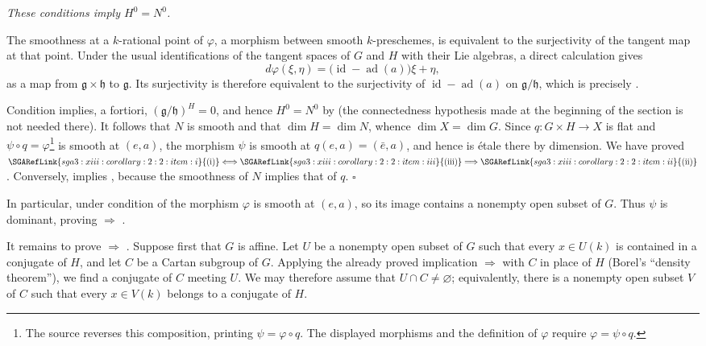 \textit{These conditions imply \(H^0=N^0\).}

The smoothness at a \(k\)-rational point of \(\varphi\), a morphism
between smooth \(k\)-preschemes, is equivalent to the surjectivity of
the tangent map at that point. Under the usual identifications of
the tangent spaces of \(G\) and \(H\) with their Lie algebras, a
direct calculation gives
\[
  d\varphi(\xi,\eta)
  =\bigl(\operatorname{id}-\operatorname{ad}(a)\bigr)\xi+\eta,
\]
as a map from \(\mathfrak g\times\mathfrak h\) to \(\mathfrak g\).
Its surjectivity is therefore equivalent to the surjectivity of
\(\operatorname{id}-\operatorname{ad}(a)\) on
\(\mathfrak g/\mathfrak h\), which is precisely .

Condition  implies, a fortiori,
\((\mathfrak g/\mathfrak h)^H=0\), and hence \(H^0=N^0\) by 
(the connectedness hypothesis made at the beginning of the section
is not needed there). It follows that \(N\) is smooth and that
\(\dim H=\dim N\), whence \(\dim X=\dim G\). Since
\(q:G\times H\to X\) is flat and
\(\psi\circ q=\varphi\)\footnote{The source reverses this composition,
printing \(\psi=\varphi\circ q\). The displayed morphisms and the
definition of \(\varphi\) require \(\varphi=\psi\circ q\).} is smooth
at \((e,a)\), the morphism \(\psi\)
is smooth at \(q(e,a)=(\bar e,a)\), and hence is étale there by
dimension. We have proved
\(\SGARefLink{sga3:xiii:corollary:2:2:item:i}{\mathrm{(i)}}\Longleftrightarrow\SGARefLink{sga3:xiii:corollary:2:2:item:iii}{\mathrm{(iii)}}
\Longrightarrow\SGARefLink{sga3:xiii:corollary:2:2:item:ii}{\mathrm{(ii)}}\). Conversely,  implies ,
because the smoothness of \(N\) implies that of \(q\).
\hfill\(\square\)

In particular, under condition  of  the morphism
\(\varphi\) is smooth at \((e,a)\), so its image contains a nonempty
open subset of \(G\). Thus \(\psi\) is dominant, proving
 \(\Rightarrow\) .

It remains to prove  \(\Rightarrow\) . Suppose first that
\(G\) is affine. Let \(U\) be a nonempty open subset of \(G\) such
that every \(x\in U(k)\) is contained in a conjugate of \(H\), and
let \(C\) be a Cartan subgroup of \(G\). Applying the already proved
implication  \(\Rightarrow\)  with \(C\) in place of \(H\)
(Borel's ``density theorem''), we find a conjugate of \(C\) meeting
\(U\). We may therefore assume that \(U\cap C\neq\varnothing\);
equivalently, there is a nonempty open subset \(V\) of \(C\) such
that every \(x\in V(k)\) belongs to a conjugate of \(H\).

